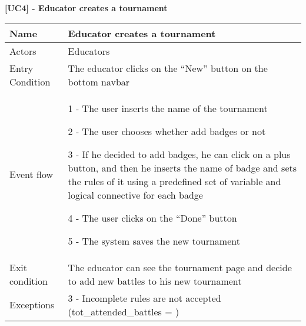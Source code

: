     \begin{table}[]
    \textbf{[UC4] - Educator creates a tournament}
    
      \centering
      \begin{tabular}{|p{3cm}|p{14cm}|}
        \hline
         Name & Educator creates a tournament \\
        \hline
        Actors & Educators \\
        \hline
        Entry Condition & The educator clicks on the ``New'' button on the bottom navbar \\
        \hline
        Event flow &  1 - The user inserts the name of the tournament
        
        2 - The user chooses whether add badges or not

        3 - If he decided to add badges, he can click on a plus button, and then he inserts the name of badge and sets the rules of it using a predefined set of variable and logical connective for each badge

        4 - The user clicks on the ``Done'' button

        5 - The system saves the new tournament
        \\
        \hline
        Exit condition & The educator can see the tournament page and decide to add new battles to his new tournament \\
        \hline
        Exceptions &
        3 - Incomplete rules are not accepted (tot\_attended\_battles = )
        \\
        \hline
      \end{tabular}
    \end{table}

